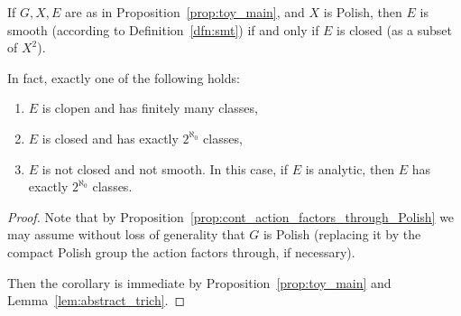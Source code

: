 	\begin{cor}
		\label{cor:toy_trich}
		If $G, X, E$ are as in Proposition~\ref{prop:toy_main}, and $X$ is Polish, then $E$ is smooth (according to Definition~\ref{dfn:smt}) if and only if $E$ is closed (as a subset of $X^2$).
		
		In fact, exactly one of the following holds:
		\begin{enumerate}
			\item
			$E$ is clopen and has finitely many classes,
			\item
			$E$ is closed and has exactly $2^{\aleph_0}$ classes,
			\item
			$E$ is not closed and not smooth. In this case, if $E$ is analytic, then $E$ has exactly $2^{\aleph_0}$ classes.
		\end{enumerate}
	\end{cor}
	\begin{proof}
		Note that by Proposition~\ref{prop:cont_action_factors_through_Polish} we may assume without loss of generality that $G$ is Polish (replacing it by the compact Polish group the action factors through, if necessary).
		
		Then the corollary is immediate by Proposition~\ref{prop:toy_main} and Lemma~\ref{lem:abstract_trich}.
	\end{proof}
	
